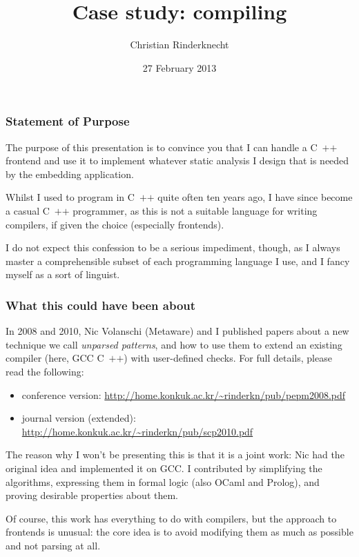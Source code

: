 \documentclass[compress,dvips,xcolor={dvipsnames},t]{beamer}
\title{Case study: compiling \ASN}
\author{Christian Rinderknecht}
\date{27 February 2013}
\newcommand\Cpp{\mbox{\textsf{C} \hspace*{-2.5mm} \raise 0.7mm \hbox
{${\scriptscriptstyle \textsf{++}}$}}\xspace}
\begin{document}
\frame{\maketitle}

\begin{frame}
\frametitle{Statement of Purpose}

The purpose of this presentation is to convince you that I can handle
a \Cpp frontend and use it to implement whatever static analysis I
design that is needed by the embedding application.

\bigskip

Whilst I used to program in \Cpp quite often ten years ago, I have
since become a casual \Cpp programmer, as this is not a suitable
language for writing compilers, if given the choice (especially
frontends).

\bigskip

I do not expect this confession to be a serious impediment, though, as
I always master a comprehensible subset of each programming language I
use, and I fancy myself as a sort of linguist.

\end{frame}


\begin{frame}
\frametitle{What this could have been about}

In 2008 and 2010, Nic Volanschi (Metaware) and I published papers
about a new technique we call \emph{unparsed patterns}, and how to use
them to extend an existing compiler (here, GCC \Cpp) with user-defined
checks. For full details, please read the following:
\begin{itemize}

  \item conference version: {\small\url{http://home.konkuk.ac.kr/~rinderkn/pub/pepm2008.pdf}}

  \item journal version (extended): {\small\url{http://home.konkuk.ac.kr/~rinderkn/pub/scp2010.pdf}}

\end{itemize}
The reason why I won't be presenting this is that it is a joint work:
Nic had the original idea and implemented it on GCC. I contributed by
simplifying the algorithms, expressing them in formal logic (also
OCaml and Prolog), and proving desirable properties about them.

\medskip

Of course, this work has everything to do with compilers, but the
approach to frontends is unusual: the core idea is to avoid modifying
them as much as possible and not parsing at all.

\end{frame}
\end{document}
